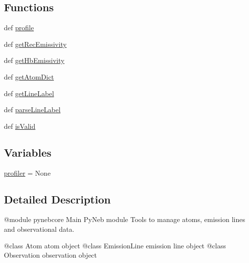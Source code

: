 \subsection*{Functions}
\begin{DoxyCompactItemize}
\item 
def \hyperlink{namespacepyneb_1_1core_1_1pynebcore_ac77de41f85dcf82405ec588c382fe456}{profile}
\item 
def \hyperlink{namespacepyneb_1_1core_1_1pynebcore_aba9d4a5306330dd47f8a51455514c017}{get\-Rec\-Emissivity}
\item 
def \hyperlink{namespacepyneb_1_1core_1_1pynebcore_a027537ead17492a35c3e4e940cd95223}{get\-Hb\-Emissivity}
\item 
def \hyperlink{namespacepyneb_1_1core_1_1pynebcore_a827f434ffd7a142d4ee91740b0174c1a}{get\-Atom\-Dict}
\item 
def \hyperlink{namespacepyneb_1_1core_1_1pynebcore_a14c882fc308d727f77ed33c1f56212e4}{get\-Line\-Label}
\item 
def \hyperlink{namespacepyneb_1_1core_1_1pynebcore_a15b88e2a4daeae68052060cb425c7a1c}{parse\-Line\-Label}
\item 
def \hyperlink{namespacepyneb_1_1core_1_1pynebcore_af6bc1553900518f0f154cafda868e1e4}{is\-Valid}
\end{DoxyCompactItemize}
\subsection*{Variables}
\begin{DoxyCompactItemize}
\item 
\hyperlink{namespacepyneb_1_1core_1_1pynebcore_ab9e20b2acbbf8eec3da84081929fae24}{profiler} = None
\end{DoxyCompactItemize}


\subsection{Detailed Description}
\begin{DoxyVerb}@module pynebcore
Main PyNeb module
Tools to manage atoms, emission lines and observational data.

@class Atom           atom object
@class EmissionLine   emission line object
@class Observation    observation object\end{DoxyVerb}
 

